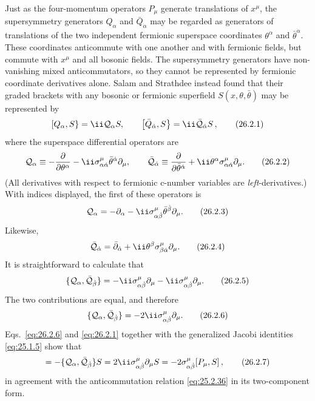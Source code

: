 Just as the four-momentum operators $P_\mu$ generate translations of
$x^\mu$, the supersymmetry generators \(Q_\alpha\) and
\(\bar Q_{\dot\alpha}\) may be regarded as generators of translations of
the two independent fermionic superspace coordinates
\(\theta^\alpha\) and \(\bar\theta^{\dot\alpha}\).  These coordinates
anticommute with one another and with fermionic fields, but commute with
$x^\mu$ and all bosonic fields.  The supersymmetry generators have
non-vanishing mixed anticommutators, so they cannot be represented by
fermionic coordinate derivatives alone.  Salam and Strathdee instead found
that their graded brackets with any bosonic or fermionic superfield
$S(x,\theta,\bar\theta)$ may be represented by
\begin{equation}
  \gradedbracket{Q_\alpha}{S}=\ii\SuperQ_\alpha S,
  \qquad
  \gradedbracket{\bar Q_{\dot\alpha}}{S}
  =\ii\bar{\SuperQ}_{\dot\alpha}S\,,
  \tag{26.2.1}\label{eq:26.2.1}
\end{equation}
where the superspace differential operators are
\begin{equation}
  \SuperQ_\alpha
  \equiv-\frac{\partial}{\partial\theta^\alpha}
  -\ii\sigma^\mu_{\alpha\dot\alpha}\bar\theta^{\dot\alpha}\partial_\mu,
  \qquad
  \bar{\SuperQ}_{\dot\alpha}
  \equiv\frac{\partial}{\partial\bar\theta^{\dot\alpha}}
  +\ii\theta^\alpha\sigma^\mu_{\alpha\dot\alpha}\partial_\mu .
  \tag{26.2.2}\label{eq:26.2.2}
\end{equation}
(All derivatives with respect to fermionic c-number variables are
\emph{left}-derivatives.)  With indices displayed, the first of these
operators is
\begin{equation}
  \SuperQ_\alpha
  =-\partial_\alpha
  -\ii\sigma^\mu_{\alpha\dot\beta}\bar\theta^{\dot\beta}\partial_\mu .
  \tag{26.2.3}\label{eq:26.2.3}
\end{equation}
Likewise,
\begin{equation}
  \bar{\SuperQ}_{\dot\alpha}
  =\bar\partial_{\dot\alpha}
  +\ii\theta^\beta\sigma^\mu_{\beta\dot\alpha}\partial_\mu .
  \tag{26.2.4}\label{eq:26.2.4}
\end{equation}
It is straightforward to calculate that
\begin{equation}
  \{\SuperQ_\alpha,\bar{\SuperQ}_{\dot\beta}\}
  =-\ii\sigma^\mu_{\alpha\dot\beta}\partial_\mu
   -\ii\sigma^\mu_{\alpha\dot\beta}\partial_\mu .
  \tag{26.2.5}\label{eq:26.2.5}
\end{equation}
The two contributions are equal, and therefore
\begin{equation}
  \{\SuperQ_\alpha,\bar{\SuperQ}_{\dot\beta}\}
  =-2\ii\sigma^\mu_{\alpha\dot\beta}\partial_\mu .
  \tag{26.2.6}\label{eq:26.2.6}
\end{equation}
Eqs.~\eqref{eq:26.2.6} and \eqref{eq:26.2.1} together with the generalized
Jacobi identities \eqref{eq:25.1.5} show that
\begin{equation}
  [\{Q_\alpha,\bar Q_{\dot\beta}\},S]
  =-\{\SuperQ_\alpha,\bar{\SuperQ}_{\dot\beta}\}S
  =2\ii\sigma^\mu_{\alpha\dot\beta}\partial_\mu S
  =-2\sigma^\mu_{\alpha\dot\beta}[P_\mu,S]\,,
  \tag{26.2.7}\label{eq:26.2.7}
\end{equation}
in agreement with the anticommutation relation \eqref{eq:25.2.36} in its
two-component form.

